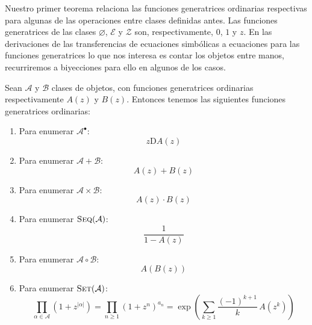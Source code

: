   Nuestro primer teorema
  relaciona las funciones generatrices ordinarias
  respectivas para algunas de las operaciones entre clases
  definidas antes.
  Las funciones generatrices de las clases \(\varnothing\),
  \(\mathcal{E}\) y \(\mathcal{Z}\)
  son,
  respectivamente,
  \(0\), \(1\) y \(z\).
  En las derivaciones
  de las transferencias de ecuaciones simbólicas
  a ecuaciones para las funciones generatrices
  lo que nos interesa es contar los objetos entre manos,
  recurriremos a biyecciones para ello en algunos de los casos.
  \begin{theorem}
    \label{theo:ms-OGF}
    Sean \(\mathcal{A}\) y \(\mathcal{B}\) clases de objetos,
    con funciones generatrices ordinarias
    respectivamente \(A(z)\) y \(B(z)\).
    Entonces tenemos
    las siguientes funciones generatrices ordinarias:
    \begin{enumerate}
    \item
      Para enumerar \(\mathcal{A}^\bullet\):
      \begin{equation*}
	z \mathrm{D} A(z)
      \end{equation*}
    \item
      Para enumerar \(\mathcal{A} + \mathcal{B}\):
      \begin{equation*}
	A(z) + B(z)
      \end{equation*}
    \item
      Para enumerar \(\mathcal{A} \times \mathcal{B}\):
      \begin{equation*}
	A(z) \cdot B(z)
      \end{equation*}
    \item
      Para enumerar \(\operatorname{\textsc{Seq}}(\mathcal{A})\):
      \begin{equation*}
	\frac{1}{1 - A(z)}
      \end{equation*}
    \item
      Para enumerar \(\mathcal{A} \circ \mathcal{B}\):
      \begin{equation*}
	A(B(z))
      \end{equation*}
    \item
      Para enumerar \(\operatorname{\textsc{Set}}(\mathcal{A})\):
      \begin{equation*}
	\prod_{\alpha \in \mathcal{A}}
	   \left( 1 + z^{\lvert \alpha \rvert} \right)
	  = \prod_{n \ge 1} (1 + z^n)^{a_n}
	  = \exp \left(
		   \sum_{k \ge 1} \frac{(-1)^{k + 1}}{k} \, A(z^k)
		 \right)
      \end{equation*}

\end{enumerate}
\end{theorem}
